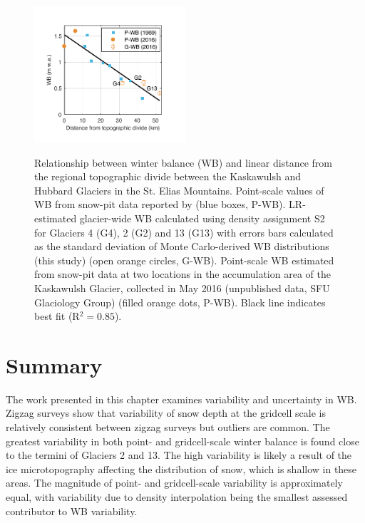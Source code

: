 \documentclass{sfuthesis}
\begin{document}
\begin{figure}[H]
	\centering
	\includegraphics[width =0.5\textwidth]{AccumGrad.pdf}\\
	\caption[Relationship between winter balance (WB) and linear distance from the regional topographic divide between the Kaskawulsh and Hubbard Glaciers in the St. Elias Mountains]{Relationship between winter balance (WB) and linear distance from the regional topographic divide between the Kaskawulsh and Hubbard Glaciers in the St. Elias Mountains. Point-scale values of WB from snow-pit data reported by \cite{Taylor1969} (blue boxes, P-WB). LR-estimated glacier-wide WB calculated using density assignment S2 for Glaciers 4 (G4), 2 (G2) and 13 (G13) with errors bars calculated as the standard deviation of Monte Carlo-derived WB distributions (this study) (open orange circles, G-WB). Point-scale WB estimated from snow-pit data at two locations in the accumulation area of the Kaskawulsh Glacier, collected in May 2016 (unpublished data, SFU Glaciology Group) (filled orange dots, P-WB). Black line indicates best fit (R$^2=0.85$).}
	\label{fig:AccumGrad}
\end{figure}



 \section{Summary}
 
The work presented in this chapter examines variability and uncertainty in WB. Zigzag surveys show that variability of snow depth at the gridcell scale is relatively consistent between zigzag surveys but outliers are common. The greatest variability in both point- and gridcell-scale winter balance is found close to the termini of Glaciers 2 and 13. The high variability is likely a result of the ice microtopography affecting the distribution of snow, which is shallow in these areas. The magnitude of point- and gridcell-scale variability is approximately equal, with variability due to density interpolation being the smallest assessed contributor to WB variability. 
 
\end{document}
